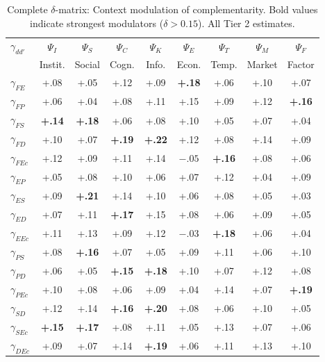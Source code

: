 \documentclass[11pt,a4paper]{article}
\theoremstyle{definition}
\begin{document}
\begin{table}[h]
\centering
\footnotesize
\begin{tabular}{l|cccccccc}
\toprule
$\gamma_{dd'}$ & $\Psi_I$ & $\Psi_S$ & $\Psi_C$ & $\Psi_K$ & $\Psi_E$ & $\Psi_T$ & $\Psi_M$ & $\Psi_F$ \\
 & Instit. & Social & Cogn. & Info. & Econ. & Temp. & Market & Factor \\
\midrule
$\gamma_{FE}$ & +.08 & +.05 & +.12 & +.09 & \textbf{+.18} & +.06 & +.10 & +.07 \\
$\gamma_{FP}$ & +.06 & +.04 & +.08 & +.11 & +.15 & +.09 & +.12 & \textbf{+.16} \\
$\gamma_{FS}$ & \textbf{+.14} & \textbf{+.18} & +.06 & +.08 & +.10 & +.05 & +.07 & +.04 \\
$\gamma_{FD}$ & +.10 & +.07 & \textbf{+.19} & \textbf{+.22} & +.12 & +.08 & +.14 & +.09 \\
$\gamma_{FEc}$ & +.12 & +.09 & +.11 & +.14 & $-.05$ & \textbf{+.16} & +.08 & +.06 \\
\midrule
$\gamma_{EP}$ & +.05 & +.08 & +.10 & +.06 & +.07 & +.12 & +.04 & +.09 \\
$\gamma_{ES}$ & +.09 & \textbf{+.21} & +.14 & +.10 & +.06 & +.08 & +.05 & +.03 \\
$\gamma_{ED}$ & +.07 & +.11 & \textbf{+.17} & +.15 & +.08 & +.06 & +.09 & +.05 \\
$\gamma_{EEc}$ & +.11 & +.13 & +.09 & +.12 & $-.03$ & \textbf{+.18} & +.06 & +.04 \\
\midrule
$\gamma_{PS}$ & +.08 & \textbf{+.16} & +.07 & +.05 & +.09 & +.11 & +.06 & +.10 \\
$\gamma_{PD}$ & +.06 & +.05 & \textbf{+.15} & \textbf{+.18} & +.10 & +.07 & +.12 & +.08 \\
$\gamma_{PEc}$ & +.10 & +.08 & +.06 & +.09 & +.04 & +.14 & +.07 & \textbf{+.19} \\
\midrule
$\gamma_{SD}$ & +.12 & +.14 & \textbf{+.16} & \textbf{+.20} & +.08 & +.06 & +.10 & +.05 \\
$\gamma_{SEc}$ & \textbf{+.15} & \textbf{+.17} & +.08 & +.11 & +.05 & +.13 & +.07 & +.06 \\
\midrule
$\gamma_{DEc}$ & +.09 & +.07 & +.14 & \textbf{+.19} & +.06 & +.11 & +.13 & +.10 \\
\bottomrule
\end{tabular}
\caption{Complete $\delta$-matrix: Context modulation of complementarity. 
Bold values indicate strongest modulators ($\delta > 0.15$). All Tier 2 estimates.}
\label{tab:delta-matrix}
\end{table}
\end{document}
